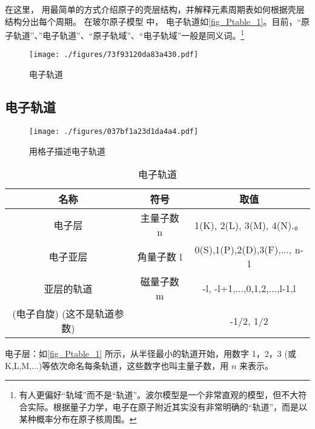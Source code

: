 
\begin{issues}
\issueTODO
\end{issues}

在这里， 用最简单的方式介绍原子的壳层结构，并解释元素周期表如何根据壳层结构分出每个周期。 在玻尔原子模型 中， 电子轨道如\autoref{fig_Ptable_1}。目前，“原子轨道”、”电子轨道”、“原子轨域”、“电子轨域”一般是同义词。\footnote{有人更偏好“轨域”而不是“轨道”。波尔模型是一个非常直观的模型，但不大符合实际。根据量子力学，电子在原子附近其实没有非常明确的“轨道”，而是以某种概率分布在原子核周围。}

\begin{figure}[ht]
\centering
\texttt{[image: ./figures/73f93120da83a430.pdf]}
\caption{电子轨道}\label{fig_Ptable_1}
\end{figure}

\subsection{电子轨道}
\begin{figure}[ht]
\centering
\texttt{[image: ./figures/037bf1a23d1da4a4.pdf]}
\caption{用格子描述电子轨道}\label{fig_Ptable_4}
\end{figure}

\begin{table}[ht]
\centering
\caption{电子轨道}\label{tab_Ptable_1}
\begin{tabular}{|c|c|c|}
\hline
名称&符号&取值\\
\hline
电子层&主量子数 n& 1(K), 2(L), 3(M), 4(N).。 \\
\hline
电子亚层&角量子数 l& 0(S),1(P),2(D),3(F),..., n-1 \\
\hline
亚层的轨道&磁量子数 m & -l, -l+1,...,0,1,2,...,l-1,l \\
\hline
(电子自旋) (这不是轨道参数)&&-1/2, 1/2\\
\hline
\end{tabular}
\end{table}

电子层：如\autoref{fig_Ptable_1} 所示，从半径最小的轨道开始，用数字 1，2，3 (或K,L,M,...)等依次命名每条轨道，这些数字也叫主量子数，用 $n$ 来表示。 

